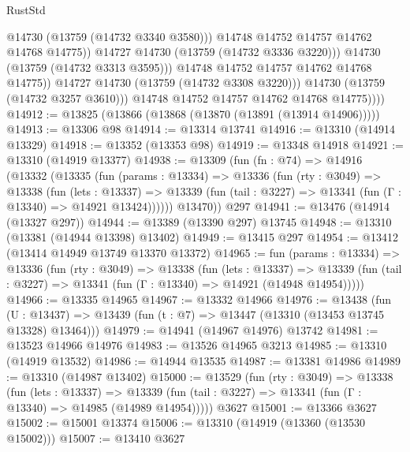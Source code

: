 \begin{lexlean}{RustStd}
\begin{coremodule}
                              @14730
                              (@13759 (@14732 @3340 @3580)))
                            @14748
                            @14752
                            @14757
                            @14762
                            @14768
                            @14775))
                        @14727
                        @14730
                        (@13759 (@14732 @3336 @3220)))
                      @14730
                      (@13759 (@14732 @3313 @3595)))
                    @14748
                    @14752
                    @14757
                    @14762
                    @14768
                    @14775))
                @14727
                @14730
                (@13759 (@14732 @3308 @3220)))
              @14730
              (@13759 (@14732 @3257 @3610)))
            @14748
            @14752
            @14757
            @14762
            @14768
            @14775))))
@14912 := @13825 (@13866 (@13868 (@13870 (@13891 (@13914 @14906)))))
@14913 := @13306 @98
@14914 := @13314 @13741
@14916 := @13310 (@14914 @13329)
@14918 := @13352 (@13353 @98)
@14919 := @13348 @14918
@14921 := @13310 (@14919 @13377)
@14938 := @13309
    (fun (fn : @74) =>
    @14916
      (@13332
        (@13335
          (fun (params : @13334) =>
          @13336
            (fun (rty : @3049) =>
            @13338
              (fun (lets : @13337) =>
              @13339 (fun (tail : @3227) => @13341 (fun (Γ : @13340) => @14921 @13424))))))
        @13470))
    @297
@14941 := @13476 (@14914 (@13327 @297))
@14944 := @13389 (@13390 @297) @13745
@14948 := @13310 (@13381 (@14944 @13398) @13402)
@14949 := @13415 @297
@14954 := @13412 (@13414 @14949 @13749 @13370 @13372)
@14965 := fun (params : @13334) =>
  @13336
    (fun (rty : @3049) =>
    @13338
      (fun (lets : @13337) =>
      @13339 (fun (tail : @3227) => @13341 (fun (Γ : @13340) => @14921 (@14948 @14954)))))
@14966 := @13335 @14965
@14967 := @13332 @14966
@14976 := @13438
    (fun (U : @13437) => @13439 (fun (t : @7) => @13447 (@13310 (@13453 @13745 @13328) @13464)))
@14979 := @14941 (@14967 @14976) @13742
@14981 := @13523 @14966 @14976
@14983 := @13526 @14965 @3213
@14985 := @13310 (@14919 @13532)
@14986 := @14944 @13535
@14987 := @13381 @14986
@14989 := @13310 (@14987 @13402)
@15000 := @13529
    (fun (rty : @3049) =>
    @13338
      (fun (lets : @13337) =>
      @13339 (fun (tail : @3227) => @13341 (fun (Γ : @13340) => @14985 (@14989 @14954)))))
    @3627
@15001 := @13366 @3627
@15002 := @15001 @13374
@15006 := @13310 (@14919 (@13360 (@13530 @15002)))
@15007 := @13410 @3627

\end{coremodule}
\end{lexlean}
